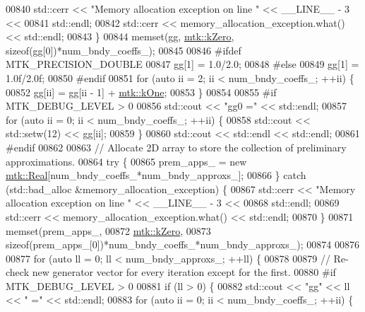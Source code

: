 \begin{DoxyCode}
{{00840     std::cerr << \textcolor{stringliteral}{"Memory allocation exception on line "} << \_\_LINE\_\_ - 3 <<
00841       std::endl;
00842     std::cerr << memory\_allocation\_exception.what() << std::endl;
00843   \}
00844   memset(gg, \hyperlink{group__c01-roots_ga59a451a5fae30d59649bcda274fea271}{mtk::kZero}, \textcolor{keyword}{sizeof}(gg[0])*num\_bndy\_coeffs\_);
00845 
00846 \textcolor{preprocessor}{  #ifdef MTK\_PRECISION\_DOUBLE}
00847   gg[1] = 1.0/2.0;
00848 \textcolor{preprocessor}{  #else}
00849   gg[1] = 1.0f/2.0f;
00850 \textcolor{preprocessor}{  #endif}
00851   \textcolor{keywordflow}{for} (\textcolor{keyword}{auto} ii = 2; ii < num\_bndy\_coeffs\_; ++ii) \{
00852     gg[ii] = gg[ii - 1] + \hyperlink{group__c01-roots_ga26407c24d43b6b95480943340d285c71}{mtk::kOne};
00853   \}
00854 
00855 \textcolor{preprocessor}{  #if MTK\_DEBUG\_LEVEL > 0}
00856   std::cout << \textcolor{stringliteral}{"gg0 ="} << std::endl;
00857   \textcolor{keywordflow}{for} (\textcolor{keyword}{auto} ii = 0; ii < num\_bndy\_coeffs\_; ++ii) \{
00858     std::cout << std::setw(12) << gg[ii];
00859   \}
00860   std::cout << std::endl << std::endl;
00861 \textcolor{preprocessor}{  #endif}
00862 
00863   \textcolor{comment}{// Allocate 2D array to store the collection of preliminary approximations.}
00864   \textcolor{keywordflow}{try} \{
00865     prem\_apps\_ = \textcolor{keyword}{new} \hyperlink{group__c01-roots_gac080bbbf5cbb5502c9f00405f894857d}{mtk::Real}[num\_bndy\_coeffs\_*num\_bndy\_approxs\_];
00866   \} \textcolor{keywordflow}{catch} (std::bad\_alloc &memory\_allocation\_exception) \{
00867     std::cerr << \textcolor{stringliteral}{"Memory allocation exception on line "} << \_\_LINE\_\_ - 3 <<
00868 std::endl;
00869     std::cerr << memory\_allocation\_exception.what() << std::endl;
00870   \}
00871   memset(prem\_apps\_,
00872          \hyperlink{group__c01-roots_ga59a451a5fae30d59649bcda274fea271}{mtk::kZero},
00873          \textcolor{keyword}{sizeof}(prem\_apps\_[0])*num\_bndy\_coeffs\_*num\_bndy\_approxs\_);
00874 
00876 
00877   \textcolor{keywordflow}{for} (\textcolor{keyword}{auto} ll = 0; ll < num\_bndy\_approxs\_; ++ll) \{
00878 
00879     \textcolor{comment}{// Re-check new generator vector for every iteration except for the first.}
00880 \textcolor{preprocessor}{    #if MTK\_DEBUG\_LEVEL > 0}
00881     \textcolor{keywordflow}{if} (ll > 0) \{
00882       std::cout << \textcolor{stringliteral}{"gg"} << ll << \textcolor{stringliteral}{" ="} << std::endl;
00883       \textcolor{keywordflow}{for} (\textcolor{keyword}{auto} ii = 0; ii < num\_bndy\_coeffs\_; ++ii) \{
}}
\end{DoxyCode}
